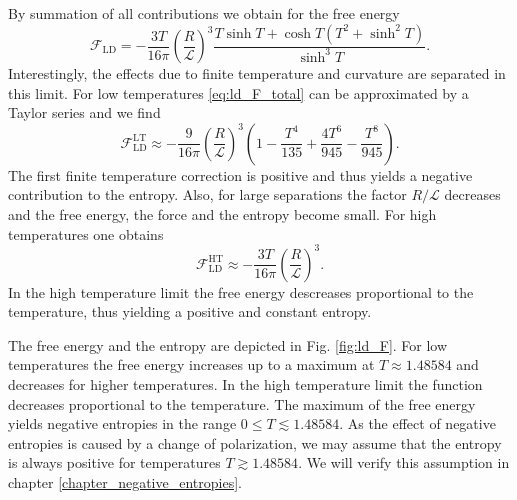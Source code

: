 By summation of all contributions we obtain for the free energy
\begin{equation}
\label{eq:ld_F_total}
\mathcal{F}_\text{LD} = -\frac{3T}{16\pi} \left(\frac{R}{\mathcal{L}}\right)^3 \frac{T\sinh T + \cosh T\left(T^2+\sinh^2 T\right)}{\sinh^3 T}.
\end{equation}
Interestingly, the effects due to finite temperature and curvature are
separated in this limit. For low temperatures \eqref{eq:ld_F_total} can be
approximated by a Taylor series and we find
\begin{equation}
\label{eq:ld_F_LT}
\mathcal{F}_\text{LD}^\text{LT} \approx -\frac{9}{16\pi} \left(\frac{R}{\mathcal{L}}\right)^3 \left(1 - \frac{T^4}{135} + \frac{4T^6}{945} - \frac{T^8}{945}\right).
\end{equation}
The first finite temperature correction is positive and thus yields a negative
contribution to the entropy. Also, for large separations the factor $R/\mathcal{L}$
decreases and the free energy, the force and the entropy become small.
For high temperatures one obtains
\begin{equation}
\mathcal{F}_\text{LD}^\text{HT} \approx -\frac{3T}{16\pi} \left(\frac{R}{\mathcal{L}}\right)^3.
\end{equation}
In the high temperature limit the free energy descreases proportional to the
temperature, thus yielding a positive and constant entropy.

The free energy and the entropy are depicted in Fig. \ref{fig:ld_F}. For low
temperatures the free energy increases up to a maximum at $T\approx1.48584$ and
decreases for higher temperatures. In the high temperature limit the function
decreases proportional to the temperature. The maximum of the free energy
yields negative entropies in the range $0 \le T \lesssim 1.48584$. As the effect
of negative entropies is caused by a change of polarization, we may assume that
the entropy is always positive for temperatures $T \gtrsim 1.48584$. We will
verify this assumption in chapter \ref{chapter_negative_entropies}.
